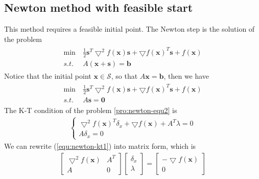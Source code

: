 \subsection{Newton method with feasible start}
This method requires a feasible initial point. The
Newton step is the solution of the problem
\begin{align}
    \begin{array}{ll}
        \min \ &\frac{1}{2}\mathbf{s}^T \bigtriangledown^2 f(\mathbf{x})
        \mathbf{s} + \bigtriangledown f(\mathbf{x})^T \mathbf{s}
        + f(\mathbf{x}) \\
        s.t. \ &A(\mathbf{x} + \mathbf{s}) = \mathbf{b}
    \end{array}
    \label{pro:newton-equ1}
\end{align}
Notice that the initial point $\mathbf{x} \in \mathcal{S}$, so that
$A\mathbf{x} = \mathbf{b}$, then we have
\begin{align}
    \begin{array}{ll}
        \min \ &\frac{1}{2}\mathbf{s}^T \bigtriangledown^2 f(\mathbf{x})
        \mathbf{s} + \bigtriangledown f(\mathbf{x})^T \mathbf{s}
        + f(\mathbf{x}) \\
        s.t. \ &A\mathbf{s} = \mathbf{0}
    \end{array}
    \label{pro:newton-equ2}
\end{align}
The K-T condition of the problem \ref{pro:newton-equ2} is
\begin{align}
    \left\{
        \begin{array}{ll}
            \bigtriangledown^2 f(\mathbf{x})^T \delta_x
             + \bigtriangledown f(\mathbf{x}) + A^T \lambda = 0 \\
             A\delta_x = 0
        \end{array}\right.
        \label{equ:newton-kt2}
\end{align}
We can rewrite (\ref{equ:newton-kt1}) into matrix form, which is
\begin{align}
    \begin{bmatrix}
        \bigtriangledown^2 f(\mathbf{x}) &A^T \\
        A & 0
    \end{bmatrix}
    \begin{bmatrix}
        \delta_x \\
        \lambda
    \end{bmatrix} = 
    \begin{bmatrix}
        -\bigtriangledown f(\mathbf{x}) \\
        0
    \end{bmatrix}
\end{align}

